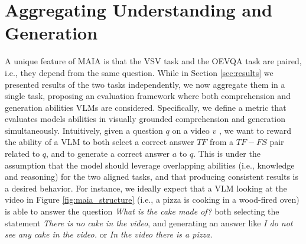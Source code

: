 








    





\section{Aggregating Understanding and Generation}
\label{sec:Understanding-Generation}
A unique feature of MAIA is that the VSV task and the OEVQA task are paired, i.e., they depend from the same question. While in Section \ref{sec:results} we presented results of the two tasks independently, we now aggregate them in a single task, proposing an evaluation framework where both comprehension and generation abilities VLMs are considered. Specifically, we define a metric that evaluates models abilities in visually grounded comprehension and generation simultaneously.
Intuitively, given a question $q$ on a video $v$ , we want to reward the ability of a VLM to both select a correct answer $TF$ from a $TF-FS$ pair related to $q$, and to generate a correct answer $a$ to $q$. This is under the assumption that the model should leverage overlapping abilities (i.e., knowledge and reasoning) for the two aligned tasks, and that producing consistent results is a desired behavior. For instance, we ideally expect that a VLM looking at the  video in Figure \ref{fig:maia_structure} (i.e., a pizza is cooking in a wood-fired oven) is able to answer the question \textit{What is the cake made of?} both selecting the statement \textit{There is no cake in the video}, and generating an answer like \textit{I do not see any cake in the video.} or \textit{In the video there is a pizza.} 

